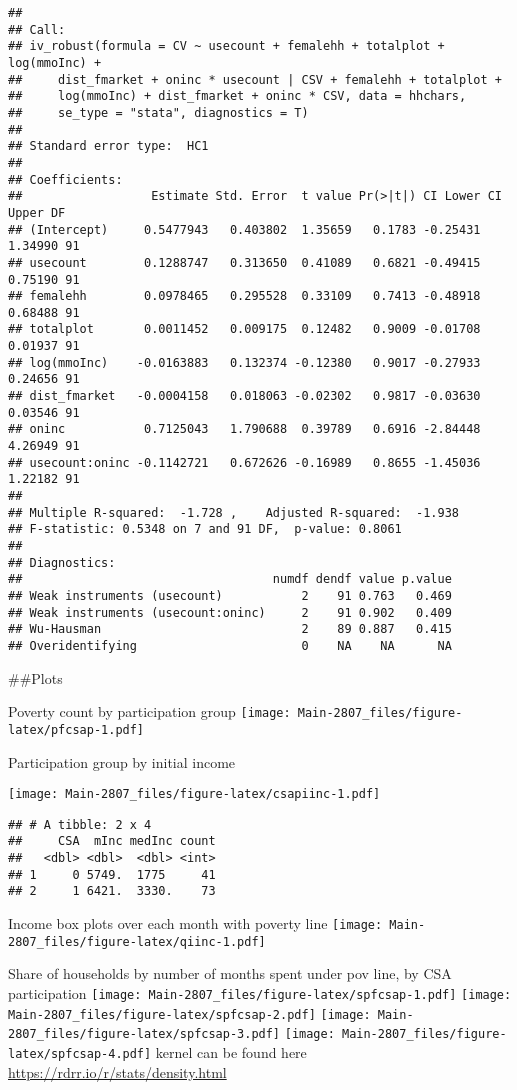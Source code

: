 \documentclass[
]{article}
\begin{document}
\begin{verbatim}
## 
## Call:
## iv_robust(formula = CV ~ usecount + femalehh + totalplot + log(mmoInc) + 
##     dist_fmarket + oninc * usecount | CSV + femalehh + totalplot + 
##     log(mmoInc) + dist_fmarket + oninc * CSV, data = hhchars, 
##     se_type = "stata", diagnostics = T)
## 
## Standard error type:  HC1 
## 
## Coefficients:
##                  Estimate Std. Error  t value Pr(>|t|) CI Lower CI Upper DF
## (Intercept)     0.5477943   0.403802  1.35659   0.1783 -0.25431  1.34990 91
## usecount        0.1288747   0.313650  0.41089   0.6821 -0.49415  0.75190 91
## femalehh        0.0978465   0.295528  0.33109   0.7413 -0.48918  0.68488 91
## totalplot       0.0011452   0.009175  0.12482   0.9009 -0.01708  0.01937 91
## log(mmoInc)    -0.0163883   0.132374 -0.12380   0.9017 -0.27933  0.24656 91
## dist_fmarket   -0.0004158   0.018063 -0.02302   0.9817 -0.03630  0.03546 91
## oninc           0.7125043   1.790688  0.39789   0.6916 -2.84448  4.26949 91
## usecount:oninc -0.1142721   0.672626 -0.16989   0.8655 -1.45036  1.22182 91
## 
## Multiple R-squared:  -1.728 ,    Adjusted R-squared:  -1.938 
## F-statistic: 0.5348 on 7 and 91 DF,  p-value: 0.8061
## 
## Diagnostics:
##                                   numdf dendf value p.value
## Weak instruments (usecount)           2    91 0.763   0.469
## Weak instruments (usecount:oninc)     2    91 0.902   0.409
## Wu-Hausman                            2    89 0.887   0.415
## Overidentifying                       0    NA    NA      NA
\end{verbatim}

\#\#Plots

Poverty count by participation group
\texttt{[image: Main-2807\_files/figure-latex/pfcsap-1.pdf]}

Participation group by initial income

\texttt{[image: Main-2807\_files/figure-latex/csapiinc-1.pdf]}

\begin{verbatim}
## # A tibble: 2 x 4
##     CSA  mInc medInc count
##   <dbl> <dbl>  <dbl> <int>
## 1     0 5749.  1775     41
## 2     1 6421.  3330.    73
\end{verbatim}

Income box plots over each month with poverty line
\texttt{[image: Main-2807\_files/figure-latex/qiinc-1.pdf]}

Share of households by number of months spent under pov line, by CSA
participation
\texttt{[image: Main-2807\_files/figure-latex/spfcsap-1.pdf]}
\texttt{[image: Main-2807\_files/figure-latex/spfcsap-2.pdf]}
\texttt{[image: Main-2807\_files/figure-latex/spfcsap-3.pdf]}
\texttt{[image: Main-2807\_files/figure-latex/spfcsap-4.pdf]} kernel can
be found here \url{https://rdrr.io/r/stats/density.html}
\end{document}

